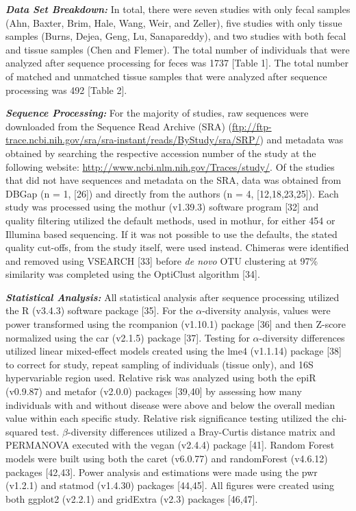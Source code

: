 \documentclass[12pt,]{article}
\begin{document}
\textbf{\emph{Data Set Breakdown:}} In total, there were seven studies
with only fecal samples (Ahn, Baxter, Brim, Hale, Wang, Weir, and
Zeller), five studies with only tissue samples (Burns, Dejea, Geng, Lu,
Sanapareddy), and two studies with both fecal and tissue samples (Chen
and Flemer). The total number of individuals that were analyzed after
sequence processing for feces was 1737 {[}Table 1{]}. The total number
of matched and unmatched tissue samples that were analyzed after
sequence processing was 492 {[}Table 2{]}.

\textbf{\emph{Sequence Processing:}} For the majority of studies, raw
sequences were downloaded from the Sequence Read Archive (SRA)
(\url{ftp://ftp-trace.ncbi.nih.gov/sra/sra-instant/reads/ByStudy/sra/SRP/})
and metadata was obtained by searching the respective accession number
of the study at the following website:
\url{http://www.ncbi.nlm.nih.gov/Traces/study/}. Of the studies that did
not have sequences and metadata on the SRA, data was obtained from DBGap
(n = 1, {[}26{]}) and directly from the authors (n = 4,
{[}12,18,23,25{]}). Each study was processed using the mothur (v1.39.3)
software program {[}32{]} and quality filtering utilized the default
methods, used in mothur, for either 454 or Illumina based sequencing. If
it was not possible to use the defaults, the stated quality cut-offs,
from the study itself, were used instead. Chimeras were identified and
removed using VSEARCH {[}33{]} before \emph{de novo} OTU clustering at
97\% similarity was completed using the OptiClust algorithm {[}34{]}.

\textbf{\emph{Statistical Analysis:}} All statistical analysis after
sequence processing utilized the R (v3.4.3) software package {[}35{]}.
For the \(\alpha\)-diversity analysis, values were power transformed
using the rcompanion (v1.10.1) package {[}36{]} and then Z-score
normalized using the car (v2.1.5) package {[}37{]}. Testing for
\(\alpha\)-diversity differences utilized linear mixed-effect models
created using the lme4 (v1.1.14) package {[}38{]} to correct for study,
repeat sampling of individuals (tissue only), and 16S hypervariable
region used. Relative risk was analyzed using both the epiR (v0.9.87)
and metafor (v2.0.0) packages {[}39,40{]} by assessing how many
individuals with and without disease were above and below the overall
median value within each specific study. Relative risk significance
testing utilized the chi-squared test. \(\beta\)-diversity differences
utilized a Bray-Curtis distance matrix and PERMANOVA executed with the
vegan (v2.4.4) package {[}41{]}. Random Forest models were built using
both the caret (v6.0.77) and randomForest (v4.6.12) packages
{[}42,43{]}. Power analysis and estimations were made using the pwr
(v1.2.1) and statmod (v1.4.30) packages {[}44,45{]}. All figures were
created using both ggplot2 (v2.2.1) and gridExtra (v2.3) packages
{[}46,47{]}.
\end{document}
